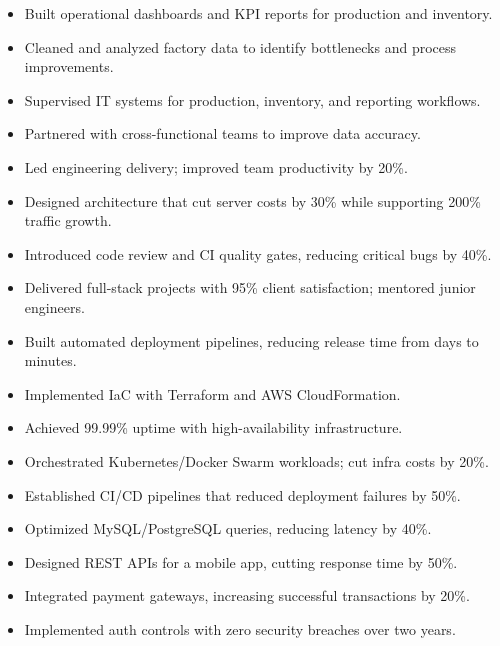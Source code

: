 \begin{itemize}
  \item Built operational dashboards and KPI reports for production and inventory.
  \item Cleaned and analyzed factory data to identify bottlenecks and process improvements.
  \item Supervised IT systems for production, inventory, and reporting workflows.
  \item Partnered with cross-functional teams to improve data accuracy.
\end{itemize}
\vspace{4pt}
\begin{itemize}
  \item Led engineering delivery; improved team productivity by 20\%.
  \item Designed architecture that cut server costs by 30\% while supporting 200\% traffic growth.
  \item Introduced code review and CI quality gates, reducing critical bugs by 40\%.
  \item Delivered full-stack projects with 95\% client satisfaction; mentored junior engineers.
\end{itemize}
\vspace{4pt}
\begin{itemize}
  \item Built automated deployment pipelines, reducing release time from days to minutes.
  \item Implemented IaC with Terraform and AWS CloudFormation.
  \item Achieved 99.99\% uptime with high-availability infrastructure.
  \item Orchestrated Kubernetes/Docker Swarm workloads; cut infra costs by 20\%.
  \item Established CI/CD pipelines that reduced deployment failures by 50\%.
\end{itemize}
\vspace{4pt}
\begin{itemize}
  \item Optimized MySQL/PostgreSQL queries, reducing latency by 40\%.
  \item Designed REST APIs for a mobile app, cutting response time by 50\%.
  \item Integrated payment gateways, increasing successful transactions by 20\%.
  \item Implemented auth controls with zero security breaches over two years.
\end{itemize}
